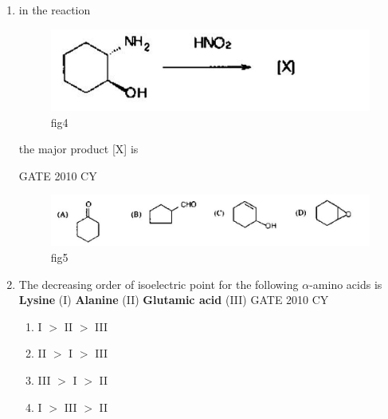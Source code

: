 \documentclass[journal,12pt,onecolumn]{IEEEtran}
\theoremstyle{remark}
\begin{document}
\begin{enumerate}
\hfill{GATE 2010 CY}

\begin{multicols}{2}
\begin{enumerate}
    \item \textit{cis}-1,2-dimethylcyclohexane
    \item \textit{cis}-1,3-dimethylcyclohexane
    \item \textit{cis}-1,4-dimethylcyclohexane
    \item \textit{trans}-1,3-dimethylcyclohexane
\end{enumerate}
\end{multicols}
\item in the reaction
\begin{figure}[H]
    \centering
    \includegraphics[width=0.5\linewidth]{figs/Q.12.png}
    \caption{fig4}
    \label{fig:figs/Q.12.png}
\end{figure}
the major product [X] is

\hfill{GATE 2010 CY}
\begin{figure}[H]
    \centering
    \includegraphics[width=0.75\linewidth]{figs/Q.12.1.png}
    \caption{fig5}
    \label{fig:figs/Q.12.1.png}
\end{figure}
\item The decreasing order of isoelectric point for the following $\alpha$-amino acids is\\
\textbf{Lysine} \hspace{1em} (I) \hspace{3em} \textbf{Alanine} \hspace{1em} (II) \hspace{3em} \textbf{Glutamic acid} \hspace{1em} (III)
\hfill{GATE 2010 CY}

\begin{multicols}{2}
\begin{enumerate}
    \item I $>$ II $>$ III
    \item II $>$ I $>$ III
    \item III $>$ I $>$ II
    \item I $>$ III $>$ II
\end{enumerate}
\end{multicols}


\end{enumerate}
\end{document}
